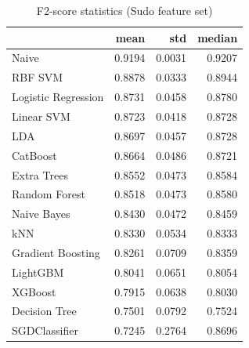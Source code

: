 \begin{table}
\caption{F2-score statistics (Sudo feature set)}
\label{tab:f2_Sudo_stats}
\begin{tabular}{lrrr}
\toprule
 & mean & std & median \\
\midrule
Naive & 0.9194 & 0.0031 & 0.9207 \\
RBF SVM & 0.8878 & 0.0333 & 0.8944 \\
Logistic Regression & 0.8731 & 0.0458 & 0.8780 \\
Linear SVM & 0.8723 & 0.0418 & 0.8728 \\
LDA & 0.8697 & 0.0457 & 0.8728 \\
CatBoost & 0.8664 & 0.0486 & 0.8721 \\
Extra Trees & 0.8552 & 0.0473 & 0.8584 \\
Random Forest & 0.8518 & 0.0473 & 0.8580 \\
Naive Bayes & 0.8430 & 0.0472 & 0.8459 \\
kNN & 0.8330 & 0.0534 & 0.8333 \\
Gradient Boosting & 0.8261 & 0.0709 & 0.8359 \\
LightGBM & 0.8041 & 0.0651 & 0.8054 \\
XGBoost & 0.7915 & 0.0638 & 0.8030 \\
Decision Tree & 0.7501 & 0.0792 & 0.7524 \\
SGDClassifier & 0.7245 & 0.2764 & 0.8696 \\
\bottomrule
\end{tabular}
\end{table}
